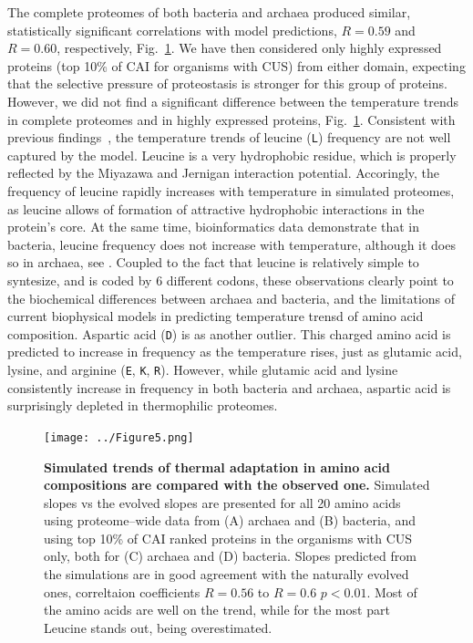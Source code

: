 \documentclass[10pt,letterpaper]{article}
\begin{document}
The complete proteomes of both bacteria and archaea produced similar, statistically significant correlations with model predictions, $R=0.59$ and $R=0.60$, respectively, Fig.~\ref{fig:fig5}. We have then considered only highly expressed proteins (top 10\% of CAI for organisms with CUS) from either domain, expecting that the selective pressure of proteostasis is stronger for this group of proteins. However, we did not find a significant difference between the temperature trends in complete proteomes and in highly expressed proteins, Fig.~\ref{fig:fig5}.  Consistent with previous findings~\cite{Venev2015Massively}, the temperature trends of leucine (\texttt{L}) frequency are not well captured by the model. Leucine is a very hydrophobic residue, which is properly reflected by the Miyazawa and Jernigan interaction potential. Accoringly, the frequency of leucine rapidly increases with temperature in simulated proteomes, as leucine allows of formation of attractive hydrophobic interactions in the protein's core. At the same time, bioinformatics data demonstrate that in bacteria, leucine frequency does not increase with temperature, although it does so in archaea, see . Coupled to the fact that leucine is relatively simple to syntesize, and is coded by 6 different codons, these observations clearly point to the biochemical differences between archaea and bacteria, and the limitations of current biophysical models in predicting temperature trensd of amino acid composition. Aspartic acid (\texttt{D}) is as another outlier. This charged amino acid is predicted to increase in frequency as the temperature rises, just as glutamic acid, lysine, and arginine (\texttt{E}, \texttt{K}, \texttt{R}). However, while glutamic acid and lysine consistently increase in frequency in both bacteria and archaea, aspartic acid is surprisingly depleted in thermophilic proteomes.


\begin{figure}[h!]
\texttt{[image: ../Figure5.png]}
\caption{
{\bf Simulated trends of thermal adaptation in amino acid compositions are compared with the observed one.} Simulated slopes vs the evolved slopes are presented for all 20 amino acids using proteome--wide data from (A) archaea and (B) bacteria, and using top 10\% of CAI ranked proteins in the organisms with CUS only, both for (C) archaea and (D) bacteria. Slopes predicted from the simulations are in good agreement with the naturally evolved ones, correltaion coefficients $R=0.56$ to $R=0.6$ $p<0.01$. Most of the amino acids are well on the trend, while for the most part Leucine stands out, being overestimated.
}
\label{fig:fig5}
\end{figure}
\end{document}
